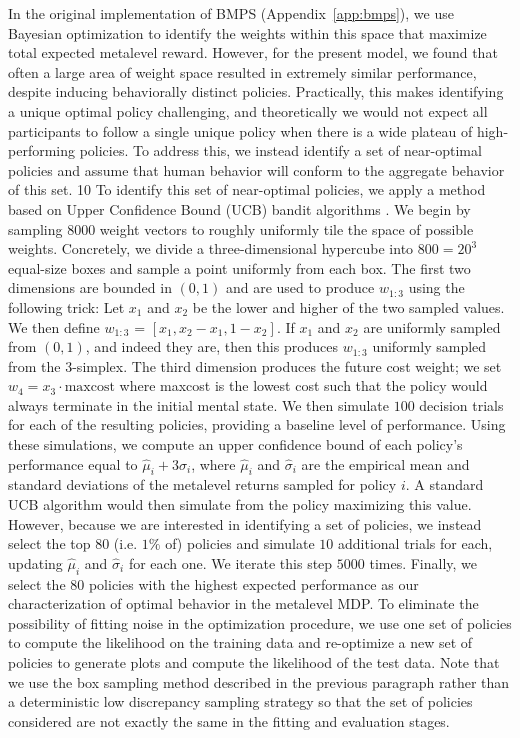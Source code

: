In the original implementation of BMPS (Appendix~\ref{app:bmps}), we use Bayesian optimization to identify the weights within this space that maximize total expected metalevel reward. However, for the present model, we found that often a large area of weight space resulted in extremely similar performance, despite inducing behaviorally distinct policies. Practically, this makes identifying a unique optimal policy challenging, and theoretically we would not expect all participants to follow a single unique policy when there is a wide plateau of high-performing policies. To address this, we instead identify a set of near-optimal policies and assume that human behavior will conform to the aggregate behavior of this set. 
 10
To identify this set of near-optimal policies, we apply a method based on Upper Confidence Bound (UCB) bandit algorithms \citep{auer2002finite}. We begin by sampling $8000$ weight vectors to roughly uniformly tile the space of possible weights. Concretely, we divide a three-dimensional hypercube into $800= 20^3$ equal-size boxes and sample a point uniformly from each box. The first two dimensions are bounded in $(0, 1)$ and are used to produce $w_{1:3}$ using the following trick: Let $x_1$ and $x_2$ be the lower and higher of the two sampled values. We then define $w_{1:3}$ = $[x_1, x_2 - x_1, 1 - x_2]$. If $x_1$ and $x_2$ are uniformly sampled from $(0, 1)$, and indeed they are, then this produces $w_{1:3}$ uniformly sampled from the 3-simplex. The third dimension produces the future cost weight; we set $w_4 = x_3 \cdot \mathrm{maxcost}$ where maxcost is the lowest cost such that the policy would always terminate in the initial mental state. We then simulate $100$ decision trials for each of the resulting policies, providing a baseline level of performance. Using these simulations, we compute an upper confidence bound of each policy's performance equal to $\hat{\mu}_i + 3\hat{\sigma}_i$, where $\hat{\mu}_i$ and $\hat{\sigma}_i$ are the empirical mean and standard deviations of the metalevel returns sampled for policy $i$. A standard UCB algorithm would then simulate from the policy maximizing this value. However, because we are interested in identifying a set of policies, we instead select the top $80$ (i.e. $1\%$ of) policies and simulate $10$ additional trials for each, updating $\hat{\mu}_i$ and $\hat{\sigma}_i$ for each one. We iterate this step $5000$ times. Finally, we select the $80$ policies with the highest expected performance as our characterization of optimal behavior in the metalevel MDP. To eliminate the possibility of fitting noise in the optimization procedure, we use one set of policies to compute the likelihood on the training data and re-optimize a new set of policies to generate plots and compute the likelihood of the test data. Note that we use the box sampling method described in the previous paragraph rather than a deterministic low discrepancy sampling strategy \citep{sobol1967distribution} so that the set of policies considered are not exactly the same in the fitting and evaluation stages.

